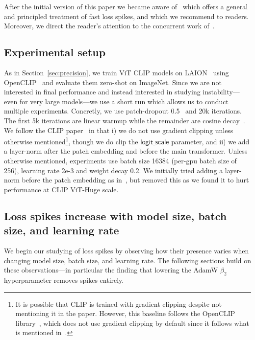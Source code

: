 After the initial version of this paper we became aware of~\citet{cohen2022adaptive} which offers a general and principled treatment of fast loss spikes, and which we recommend to readers. Moreover, we direct the reader's attention to the concurrent work of~\cite{molybog2023theory}.

\subsection{Experimental setup}\label{sec:stabset}

As in Section~\ref{sec:precision}, we train ViT CLIP models on LAION~\cite{schuhmann2022laion} using OpenCLIP~\cite{openclip} and evaluate them zero-shot on ImageNet. Since we are not interested in final performance and instead interested in studying instability---even for very large models---we use a short run which allows us to conduct multiple experiments. Concretly, we use patch-dropout 0.5~\cite{li2022scaling} and 20k iterations. The first 5k iterations are linear warmup while the remainder are cosine decay~\cite{loshchilov2016sgdr}. We follow the CLIP paper~\cite{radford2021learning} in that i) we do not use gradient clipping unless otherwise mentioned\footnote{It is possible that CLIP is trained with gradient clipping despite not mentioning it in the paper. However, this baseline follows the OpenCLIP library~\cite{openclip}, which does not use gradient clipping by default since it follows what is mentioned in~\citet{radford2021learning}.}, though we do clip the $\mathsf{logit\_scale}$ parameter, and ii) we add a layer-norm after the patch embedding and before the main transformer. Unless otherwise mentioned, experiments use batch size 16384 (per-gpu batch size of 256), learning rate 2e-3 and weight decay 0.2. We initially tried adding a layer-norm before the patch embedding as in~\cite{kumar2023dual}, but removed this as we found it to hurt performance at CLIP ViT-Huge scale.

\subsection{Loss spikes increase with model size, batch size, and learning rate}\label{sec:stabtrend}

We begin our studying of loss spikes by observing how their presence varies when changing model size, batch size, and learning rate. The following sections build on these observations---in particular the finding that lowering the AdamW $\beta_2$ hyperparameter removes spikes entirely.

